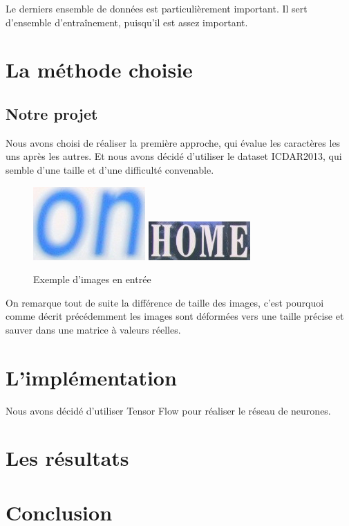 \documentclass{article}
\begin{document}
Le derniers ensemble de données est particulièrement important. Il sert d'ensemble d'entraînement, puisqu'il est assez important.

\section{La méthode choisie}

\subsection{Notre projet}
Nous avons choisi de réaliser la première approche, qui évalue les caractères les uns après les autres. Et nous avons décidé d'utiliser le dataset ICDAR2013, qui semble d'une taille et d'une difficulté convenable.

\begin{figure}[h]
  \includegraphics[scale=0.5]{./word_56.png}
  \includegraphics[scale=0.5]{./word_83.png}
  \caption{Exemple d'images en entrée}
\end{figure}

On remarque tout de suite la différence de taille des images, c'est pourquoi comme décrit précédemment les images sont déformées vers une taille précise et sauver dans une matrice à valeurs réelles. 

\section{L'implémentation}
Nous avons décidé d'utiliser Tensor Flow pour réaliser le réseau de neurones. 
\section{Les résultats}

\section{Conclusion}
\end{document}
